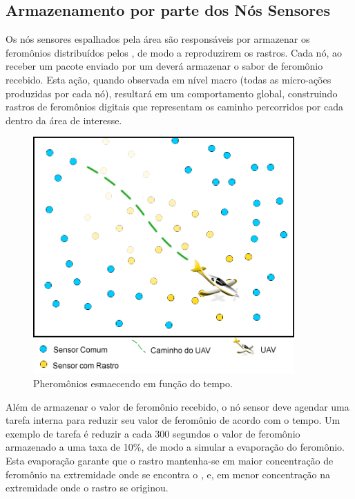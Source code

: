 \subsection{Armazenamento por parte dos Nós Sensores}
Os nós sensores espalhados pela área são responsáveis por armazenar os feromônios distribuídos pelos \vants, de modo a reproduzirem os rastros. Cada nó, ao receber um pacote enviado por um \vant deverá armazenar o sabor de feromônio recebido. Esta ação, quando observada em nível macro (todas as micro-ações produzidas por cada nó), resultará em um comportamento global, construindo rastros de feromônios digitais que representam os caminho percorridos por cada \vant dentro da área de interesse. 

 \begin{figure}[h!]
 \centering
 \includegraphics[width=10cm]{pictures/flat_pheromone.png}
 \caption{Pheromônios esmaecendo em função do tempo.}
  \label{fig:flat}
 \end{figure}

Além de armazenar o valor de feromônio recebido, o nó sensor deve agendar uma tarefa interna para reduzir seu valor de feromônio de acordo com o tempo. Um exemplo de tarefa é reduzir a cada 300 segundos o valor de feromônio armazenado a uma taxa de 10\%, de modo a simular a evaporação do feromônio. Esta evaporação garante que o rastro mantenha-se em maior concentração de feromônio na extremidade onde se encontra o \vant, e, em menor concentração na extremidade onde o rastro se originou.



